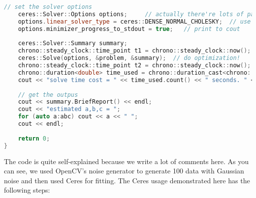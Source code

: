 \begin{lstlisting}[language=c++,caption=slambook/ch6/ceresCurveFitting.cpp]
    // set the solver options
    ceres::Solver::Options options;     // actually there're lots of params can be adjusted
    options.linear_solver_type = ceres::DENSE_NORMAL_CHOLESKY;  // use cholesky to solve the normal equation
    options.minimizer_progress_to_stdout = true;   // print to cout
    
    ceres::Solver::Summary summary;                
    chrono::steady_clock::time_point t1 = chrono::steady_clock::now();
    ceres::Solve(options, &problem, &summary);  // do optimization!
    chrono::steady_clock::time_point t2 = chrono::steady_clock::now();
    chrono::duration<double> time_used = chrono::duration_cast<chrono::duration<double>>(t2 - t1);
    cout << "solve time cost = " << time_used.count() << " seconds. " << endl;
    
    // get the outpus
    cout << summary.BriefReport() << endl;
    cout << "estimated a,b,c = ";
    for (auto a:abc) cout << a << " ";
    cout << endl;
    
    return 0;
}
\end{lstlisting}

The code is quite self-explained because we write a lot of comments here. As you can see, we used OpenCV's noise generator to generate 100 data with Gaussian noise and then used Ceres for fitting. The Ceres usage demonstrated here has the following steps:

